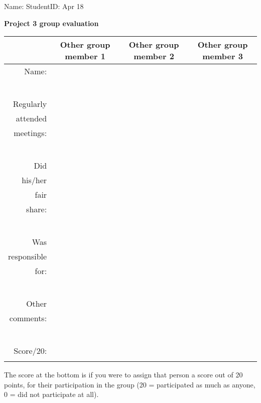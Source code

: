 \documentclass{article}
\begin{document}
\thispagestyle{empty}

Name: \underline{\hspace{2in}} StudentID: \underline{\hspace{2in}} Apr 18 


\newcommand{\oneend}{&& &\\}
\newcommand{\myend}{\oneend \oneend\oneend\oneend\oneend\oneend\oneend\hline}
\textbf{Project 3 group evaluation}

\begin{tabular}{r|c|c|c} 
& 
  Other group member 1\hspace{1cm} &
  Other group member 2\hspace{1cm} & 
  Other group member 3\hspace{1cm} \\
\hline
Name: \myend
Regularly &&&\\
attended&&&\\ meetings: \myend
Did &&&\\
 his/her &&&\\
 fair &&&\\ share: \myend
Was &&&\\
responsible&&&\\
 for: \myend
Other &&&\\
 comments: \myend
Score/20: & & &\\ 
&&&\\
\hline
\end{tabular}

The score at the bottom is if you were to assign that person a score
out of 20 points, for their participation in the group (20 =
participated as much as anyone, 0 = did not participate at all). 
\end{document}
